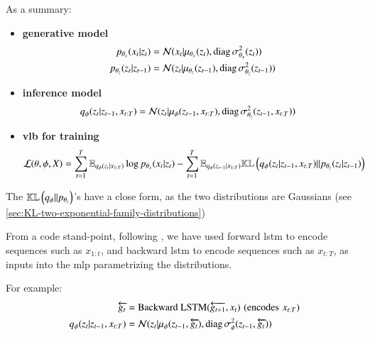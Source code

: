 As a summary:
\begin{tcolorbox}[colback=blue!5!white,colframe=black!75!black,title=Deep Kalman Filter]
\begin{itemize}
    \item \textbf{generative model}
    \begin{align}
        \label{gen_model_dkf}
        p_{\theta_x}(x_t \vert z_t) &= \mathcal{N}( x_t \vert \mu_{\theta_x}(z_t), \text{diag}\, \sigma_{\theta_x}^2(z_t))\\
        p_{\theta_z}(z_t \vert z_{t-1}) &= \mathcal{N}( z_t \vert \mu_{\theta_z}(z_{t-1}), \text{diag}\, \sigma_{\theta_z}^2(z_{t-1}))
    \end{align}
    \item \textbf{inference model}
    \begin{align}
        \label{inf_model_dkf}
        q_{\phi}(z_t \vert z_{t-1}, x_{t:T}) &= \mathcal{N}( z_t \vert \mu_{\phi}(z_{t-1}, x_{t:T}), \text{diag}\, \sigma_{\theta_z}^2(z_{t-1},x_{t:T}))
    \end{align}
    \item \textbf{\gls{vlb} for training}
    \begin{align}
        \label{vlb_dkf}
        \mathcal{L}(\theta, \phi, X) &= \sum_{t=1}^T \mathbb{E}_{q_\phi(z_{t} \vert x_{1:T})} \log{p_{\theta_x}(x_t \vert z_t)} - \sum_{t=1}^T \mathbb{E}_{q_\phi(z_{t-1} \vert x_{1:T})} \mathbb{KL}\left( q_{\phi}(z_t \vert z_{t-1}, x_{t:T}) \vert\vert p_{\theta_z}(z_t \vert z_{t-1}) \right)
    \end{align}
\end{itemize}
\end{tcolorbox}

The $\mathbb{KL}\left( q_\phi \vert\vert p_{\theta_z} \right)$'s have a close form, as the two distributions are Gaussians (see \ref{sec:KL-two-exponential-family-distributions})

From a code stand-point, following \cite{girin_dynamical_2022}, we have used forward \gls{lstm} to encode sequences such as $x_{1:t}$, and backward \gls{lstm} to encode sequences such as $x_{t:T}$, as inputs into the \gls{mlp} parametrizing the distributions. 

For example:
\begin{align*}
    \overleftarrow{g_t} &= \text{Backward LSTM}(\overleftarrow{g_{t+1}}, x_t) \,\, (\text{encodes} \,\, x_{t:T}) \\
    q_{\phi}(z_t \vert z_{t-1}, x_{t:T}) &= \mathcal{N}( z_t \vert \mu_{\phi}(z_{t-1}, \overleftarrow{g_t}), \text{diag}\, \sigma_{\phi}^2(z_{t-1}, \overleftarrow{g_t}))
\end{align*}



